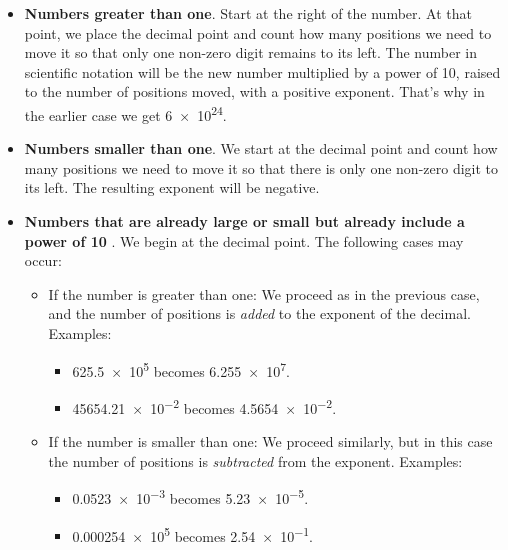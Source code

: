 \begin{itemize}
    \item \textbf{Numbers greater than one}.
    Start at the right of the number.
    At that point, we place the decimal point and count how many positions we need to move it so that only one non-zero digit remains to its left.
    The number in scientific notation will be the new number multiplied by a power of 10, raised to the number of positions moved, with a positive exponent.
    That’s why in the earlier case we get \num{6e24}.

    \item \textbf{Numbers smaller than one}.
    We start at the decimal point and count how many positions we need to move it so that there is only one non-zero digit to its left.
    The resulting exponent will be negative.

    \item \textbf{Numbers that are already large or small but already include a power of 10} .
    We begin at the decimal point.
    The following cases may occur:

    \begin{itemize}
        \item If the number is greater than one:
        We proceed as in the previous case, and the number of positions is \emph{added} to the exponent of the decimal. Examples:
        \begin{itemize}
            \item \num{625.5e5} becomes \num{6.255e7}.
            \item \num{45654.21e-2} becomes \num{4.5654e-2}.
        \end{itemize}

        \item If the number is smaller than one:
        We proceed similarly, but in this case the number of positions is \emph{subtracted} from the exponent. Examples:
        \begin{itemize}
            \item \num{0.0523e-3} becomes \num{5.23e-5}.
            \item \num{0.000254e5} becomes \num{2.54e-1}.
        \end{itemize}
    \end{itemize}
\end{itemize}

